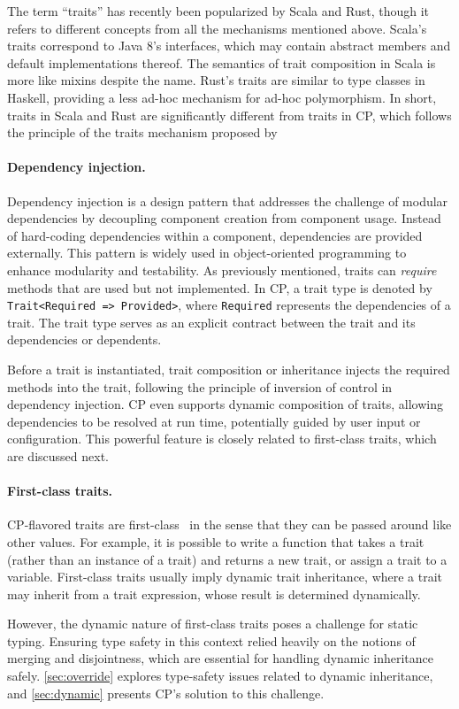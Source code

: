 The term ``traits'' has recently been popularized by Scala and Rust, though it
refers to different concepts from all the mechanisms mentioned above. Scala's
traits correspond to Java 8's interfaces, which may contain abstract members and
default implementations thereof. The semantics of trait composition in Scala is
more like mixins despite the name. Rust's traits are similar to type classes in
Haskell, providing a less ad-hoc mechanism for ad-hoc polymorphism. In short,
traits in Scala and Rust are significantly different from traits in CP, which
follows the principle of the traits mechanism proposed by
\citeauthor{ducasse2006traits}

\paragraph{Dependency injection.}
Dependency injection is a design pattern that addresses the challenge of modular
dependencies by decoupling component creation from component usage. Instead of
hard-coding dependencies within a component, dependencies are provided
externally. This pattern is widely used in object-oriented programming to
enhance modularity and testability. As previously mentioned, traits can
\emph{require} methods that are used but not implemented. In CP, a trait type is
denoted by \lstinline{Trait<Required => Provided>}, where \lstinline{Required}
represents the dependencies of a trait. The trait type serves as an explicit
contract between the trait and its dependencies or dependents.

Before a trait is instantiated, trait composition or inheritance injects the
required methods into the trait, following the principle of inversion of control
in dependency injection. CP even supports dynamic composition of traits,
allowing dependencies to be resolved at run time, potentially guided by user
input or configuration. This powerful feature is closely related to first-class
traits, which are discussed next.

\paragraph{First-class traits.}
CP-flavored traits are first-class~\citep{bi2018typed} in the sense that they
can be passed around like other values. For example, it is possible to write a
function that takes a trait (rather than an instance of a trait) and returns a
new trait, or assign a trait to a variable. First-class traits usually imply
dynamic trait inheritance, where a trait may inherit from a trait expression,
whose result is determined dynamically.

However, the dynamic nature of first-class traits poses a challenge for static
typing. Ensuring type safety in this context relied heavily on the notions of
merging and disjointness, which are essential for handling dynamic inheritance
safely. \autoref{sec:override} explores type-safety issues related to dynamic
inheritance, and \autoref{sec:dynamic} presents CP's solution to this challenge.
